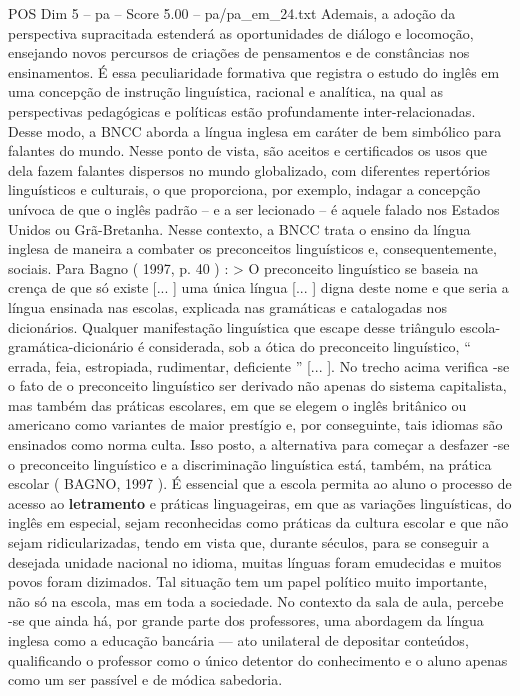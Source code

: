 \begin{textsample}{POS Dim 5 – pa – Score 5.00 – pa/pa\_em\_24.txt}  \label{ex:f5_pos_243}
Ademais, a adoção da perspectiva supracitada estenderá as oportunidades de diálogo e locomoção, ensejando novos percursos de criações de pensamentos e de constâncias nos ensinamentos.
É essa peculiaridade formativa que registra o estudo do inglês em uma concepção de instrução linguística, racional e analítica, na qual as perspectivas pedagógicas e políticas estão profundamente inter-relacionadas.
Desse modo, a BNCC aborda a língua inglesa em caráter de bem simbólico para falantes do mundo.
Nesse ponto de vista, são aceitos e certificados os usos que dela fazem falantes dispersos no mundo globalizado, com diferentes repertórios linguísticos e culturais, o que proporciona, por exemplo, indagar a concepção unívoca de que o inglês padrão – e a ser lecionado – é aquele falado nos Estados Unidos ou Grã-Bretanha.
Nesse contexto, a BNCC trata o ensino da língua inglesa de maneira a combater os preconceitos linguísticos e, consequentemente, sociais.
Para Bagno ( 1997, p. 40 ) : > O preconceito linguístico se baseia na crença de que só existe [... ] uma única língua [... ] digna deste nome e que seria a língua ensinada nas escolas, explicada nas gramáticas e catalogadas nos dicionários.
Qualquer manifestação linguística que escape desse triângulo escola-gramática-dicionário é considerada, sob a ótica do preconceito linguístico, “ errada, feia, estropiada, rudimentar, deficiente ” [... ].
No trecho acima verifica -se o fato de o preconceito linguístico ser derivado não apenas do sistema capitalista, mas também das práticas escolares, em que se elegem o inglês britânico ou americano como variantes de maior prestígio e, por conseguinte, tais idiomas são ensinados como norma culta.
Isso posto, a alternativa para começar a desfazer -se o preconceito linguístico e a discriminação linguística está, também, na prática escolar ( BAGNO, 1997 ).
É essencial que a escola permita ao aluno o processo de acesso ao \textbf{letramento} e práticas linguageiras, em que as variações linguísticas, do inglês em especial, sejam reconhecidas como práticas da cultura escolar e que não sejam ridicularizadas, tendo em vista que, durante séculos, para se conseguir a desejada unidade nacional no idioma, muitas línguas foram emudecidas e muitos povos foram dizimados.
Tal situação tem um papel político muito importante, não só na escola, mas em toda a sociedade.
No contexto da sala de aula, percebe -se que ainda há, por grande parte dos professores, uma abordagem da língua inglesa como a educação bancária — ato unilateral de depositar conteúdos, qualificando o professor como o único detentor do conhecimento e o aluno apenas como um ser passível e de módica sabedoria.

\end{textsample}
